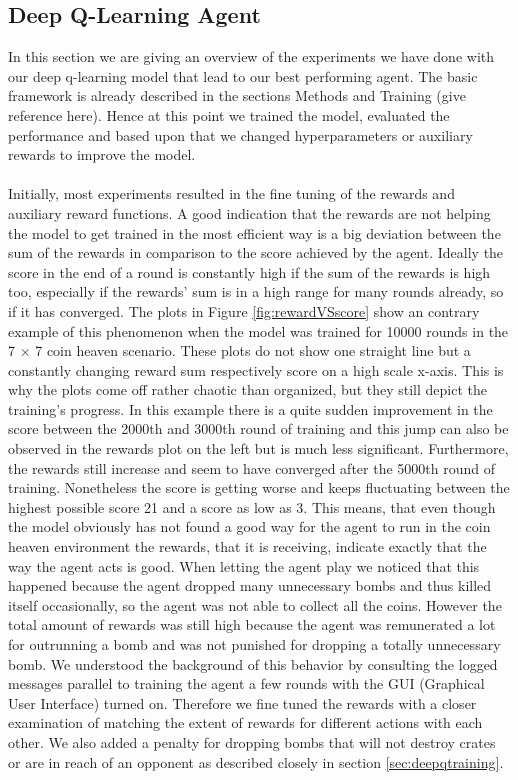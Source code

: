 \newpage
{}
\subsection{Deep Q-Learning Agent}

In this section we are giving an overview of the experiments we have done with our deep q-learning model that lead to our best performing agent. The basic framework is already described in the sections Methods and Training (give reference here). Hence at this point we trained the model, evaluated the performance and based upon that we changed hyperparameters or auxiliary rewards to improve the model.\\ \\
Initially, most experiments resulted in the fine tuning of the rewards and auxiliary reward functions. A good indication that the rewards are not helping the model to get trained in the most efficient way is a big deviation between the sum of the rewards in comparison to the score achieved by the agent. Ideally the score in the end of a round is constantly high if the sum of the rewards is high too, especially if the rewards' sum is in a high range for many rounds already, so if it has converged. The plots in Figure \ref{fig:rewardVSscore} show an contrary example of this phenomenon when the model was trained for 10000 rounds in the 7 $\times$ 7 coin heaven scenario. These plots do not show one straight line but a constantly changing reward sum respectively score on a high scale x-axis. This is why the plots come off rather chaotic than organized, but they still depict the training's progress. In this example there is a quite sudden improvement in the score between the 2000th and 3000th round of training and this jump can also be observed in the rewards plot on the left but is much less significant. Furthermore, the rewards still increase and seem to have converged after the 5000th round of training. Nonetheless the score is getting worse and keeps fluctuating between the highest possible score 21 and a score as low as 3. This means, that even though the model obviously has not found a good way for the agent to run in the coin heaven environment the rewards, that it is receiving, indicate exactly that the way the agent acts is good. When letting the agent play we noticed that this happened because the agent dropped many unnecessary bombs and thus killed itself occasionally, so the agent was not able to collect all the coins. However the total amount of rewards was still high because the agent was remunerated a lot for outrunning a bomb and was not punished for dropping a totally unnecessary bomb. We understood the background of this behavior by consulting the logged messages parallel to training the agent a few rounds with the GUI (Graphical User Interface) turned on. Therefore we fine tuned the rewards with a closer examination of matching the extent of rewards for different actions with each other. We also added a penalty for dropping bombs that will not destroy crates or are in reach of an opponent as described closely in section \ref{sec:deepqtraining}. 
